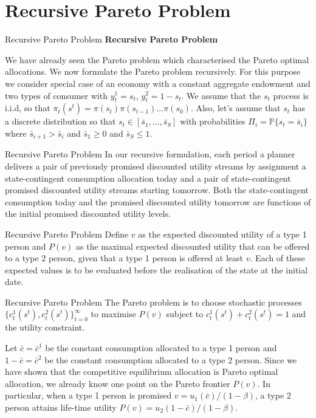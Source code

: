 \documentclass[aspectratio=169,xcolor=dvipsnames]{beamer}
\begin{document}
\section{Recursive Pareto Problem}

\begin{frame}{Recursive Pareto Problem}
    \textbf{Recursive Pareto Problem}

    We have already seen the Pareto problem which characterised the Pareto optimal allocations. We now formulate the Pareto problem recursively. For this purpose we consider special case of an economy with a constant aggregate endowment and two types of consumer with $y^1_t = s_t$, $y^2_t = 1 - s_t$. We assume that the $s_t$ process is i.i.d, so that $\pi_t(s^t) = \pi(s_t) \pi(s_{t-1}) \dots \pi(s_0)$. Also, let's assume that $s_t$ has a discrete distribution so that $s_t \in [\bar s_1, \dots, \bar s_S]$ with probabilities $\Pi_i = \mathbb{P}\{s_t = \bar s_i\}$ where $\bar s_{i+1} > \bar s_i$ and $\bar s_1 \ge 0$ and $\bar s_S \le 1$.
\end{frame}

\begin{frame}{Recursive Pareto Problem}
    In our recursive formulation, each period a planner delivers a pair of previously promised discounted utility streams by assignment a state-contingent consumption allocation today and a pair of state-contingent promised discounted utility streams starting tomorrow. Both the state-contingent consumption today and the promised discounted utility tomorrow are functions of the initial promised discounted utility levels.
\end{frame}

\begin{frame}{Recursive Pareto Problem}
    Define $v$ as the expected discounted utility of a type 1 person and $P(v)$ as the maximal expected discounted utility that can be offered to a type 2 person, given that a type 1 person is offered at least $v$. Each of these expected values is to be evaluated before the realisation of the state at the initial date.
\end{frame}

\begin{frame}{Recursive Pareto Problem}
    The Pareto problem is to choose stochastic processes $\{c^1_t(s^t), c^2_t(s^t)\}_{t=0}^\infty$ to maximise $P(v)$ subject to $c^1_t(s^t) + c^2_t(s^t) = 1$ and the utility constraint.

    Let $\bar c = \bar c^1$ be the constant consumption allocated to a type 1 person and $1 - \bar c = \bar c^2$ be the constant consumption allocated to a type 2 person. Since we have shown that the competitive equilibrium allocation is Pareto optimal allocation, we already know one point on the Pareto frontier $P(v)$. In particular, when a type 1 person is promised $v = u_1(\bar c)/(1 - \beta)$, a type 2 person attains life-time utility $P(v) = u_2(1 - \bar c)/(1 - \beta)$.
\end{frame}
\end{document}
